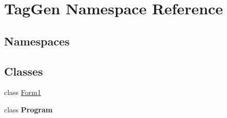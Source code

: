 \hypertarget{namespace_tag_gen}{}\section{Tag\+Gen Namespace Reference}
\label{namespace_tag_gen}
\subsection*{Namespaces}
\begin{DoxyCompactItemize}
\end{DoxyCompactItemize}
\subsection*{Classes}
\begin{DoxyCompactItemize}
\item 
class \hyperlink{class_tag_gen_1_1_form1}{Form1}
\item 
class {\bfseries Program}
\end{DoxyCompactItemize}
